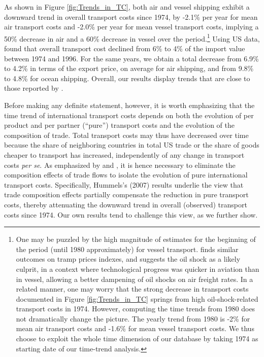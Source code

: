 \documentclass[a4paper,11pt]{article}
\begin{document}
As shown in Figure \ref{fig:Trends_in_TC}, both air and vessel shipping exhibit a downward trend in overall transport costs since 1974, by -2.1\% per year for mean air transport costs and -2.0\% per year for mean vessel transport costs, implying a 50\% decrease in air and a 60\% decrease in vessel over the period.\footnote{One may be puzzled by the high magnitude of estimates for the beginning of the period (until 1980 approximately) for vessel transport.
\cite{hummels2007} finds similar outcomes on tramp prices indexes, and suggests the oil shock as a likely culprit, in a context where technological progress was quicker in aviation than in vessel, allowing a better dampening of oil shocks on air freight rates.
In a related manner, one may worry that the strong decrease in transport costs documented in Figure \ref{fig:Trends_in_TC} springs from high oil-shock-related transport costs in 1974.
However, computing the time trends from 1980 does not dramatically change the picture.
The yearly trend from 1980 is -2\% for mean air transport costs and -1.6\% for mean vessel transport costs.
We thus choose to exploit the whole time dimension of our database by taking 1974 as starting date of our time-trend analysis.} Using US data, \cite{Hummels_1999} found that overall transport cost declined from 6\% to 4\% of the import value between 1974 and 1996.
For the same years, we obtain a total decrease from 6.9\% to 4.2\% in terms of the export price, on average for air shipping, and from 9.8\% to 4.8\% for ocean shipping.
Overall, our results display trends that are close to those reported by \cite{Hummels_1999}.\smallskip


Before making any definite statement, however, it is worth emphasizing that the time trend of international transport costs depends on both the evolution of per product and per partner (``pure'') transport costs and the evolution of the composition of trade.
Total transport costs may thus have decreased over time because the share of neighboring countries in total US trade or the share of goods cheaper to transport has increased, independently of any change in transport costs \textit{per se}.
As emphasized by \cite{Hummels_1999} and \cite{hummels2007}, it is hence necessary to eliminate the composition effects of trade flows to isolate the evolution of pure international transport costs.
Specifically, Hummels's (2007) results\nocite{hummels2007} underlie the view that trade composition effects partially compensate the reduction in pure transport costs, thereby attenuating the downward trend in overall (observed) transport costs since 1974.
Our own results tend to challenge this view, as we further show.
\end{document}
